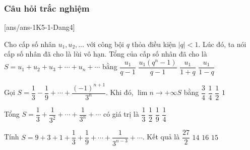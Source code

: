 \subsubsection{Câu hỏi trắc nghiệm}
[ans/ans-1K5-1-Dang4]
\begin{ex}%
	Cho cấp số nhân $u_1,u_2,\ldots$ với công bội $q$ thỏa điều kiện $|q|<1$. Lúc đó, ta nói cấp số nhân đã cho là lùi vô hạn. Tổng của cấp số nhân đã cho là $S=u_1+u_2+u_3+\cdots +u_n+\cdots$ bằng 
	\choice
	{$\dfrac{u_1}{q-1}$}
	{$\dfrac{u_1\left(q^n-1\right)}{q-1}$}
	{$\dfrac{u_1}{1+q}$}
	{\True $\dfrac{u_1}{1-q}$}
\end{ex}
\begin{ex}%
	Gọi $S=\dfrac{1}{3}-\dfrac{1}{9}+\cdots +\dfrac{(-1)^{n+1}}{3^n}$. Khi đó, $\lim \limits{n \to +\infty}S$ bằng 
	\choice
	{$\dfrac{3}{4}$}
	{\True $\dfrac{1}{4}$}
	{$\dfrac{1}{2}$}
	{$1$}
\end{ex}
\begin{ex}%
	Tổng $S=\dfrac{1}{3}+\dfrac{1}{3^2}+\cdots +\dfrac{1}{3^n}+\cdots$ có giá trị là 
	\choice
	{$\dfrac{1}{3}$}
	{\True $\dfrac{1}{2}$}
	{$\dfrac{1}{9}$}
	{$\dfrac{1}{4}$}
\end{ex}
\begin{ex}%
	Tính $S=9+3+1+\dfrac{1}{3}+\dfrac{1}{9}+\cdots +\dfrac{1}{3^{n-3}}+\cdots$. Kết quả là 
	\choice
	{\True $\dfrac{27}{2}$}
	{$14$}
	{$16$}
	{$15$}
\end{ex}

